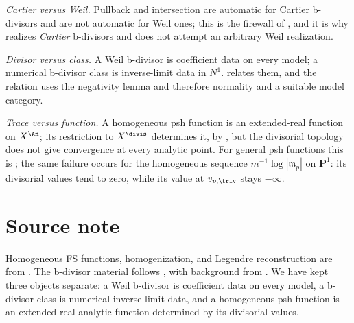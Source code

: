 \emph{Cartier versus Weil.}  Pullback and intersection are automatic for
Cartier b-divisors and are not automatic for Weil ones; this is the firewall
of , and it is why
 realizes \emph{Cartier} b-divisors and
does not attempt an arbitrary Weil realization.

\emph{Divisor versus class.}  A Weil b-divisor is coefficient data on every
model; a numerical b-divisor class is inverse-limit data in
$N^1$.   relates them, and the relation
uses the negativity lemma and therefore normality and a suitable model
category.

\emph{Trace versus function.}  A homogeneous psh function is an
extended-real function on $X^{\An}$; its restriction to
$X^{\divis}$ determines it, by
, but the divisorial topology does not give convergence at every analytic point.
For general psh functions this is ;
the same failure occurs for the homogeneous sequence
$m^{-1}\log|\mathfrak m_p|$ on $\mathbf P^1$: its divisorial values
tend to zero, while its value at $v_{p,\triv}$ stays $-\infty$.

\section{Source note}

Homogeneous FS functions, homogenization, and Legendre reconstruction are
from \cite[\S\S6.1--6.3]{BJ22}.  The b-divisor material follows
\cite[\S\S6.4--6.5]{BJ22}, with background from \cite{BFJ09,DF20}.  We have
kept three objects separate: a Weil b-divisor is coefficient data on every
model, a b-divisor class is numerical inverse-limit data, and a homogeneous
psh function is an extended-real analytic function determined by its
divisorial values.

